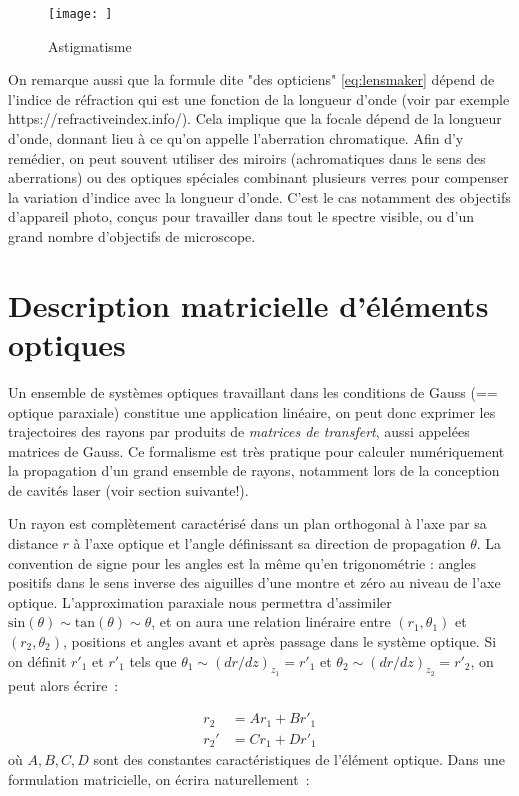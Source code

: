 \documentclass[a4paper]{book}
\begin{document}
\begin{figure}[!htbp]
\label{fig:astig}
\begin{center}
\texttt{[image: ]}
\end{center}
\caption{Astigmatisme}
\end{figure}
On remarque aussi que la formule dite "des opticiens" \ref{eq:lensmaker} dépend de l'indice de réfraction qui est une fonction de la longueur d'onde (voir par exemple https://refractiveindex.info/). Cela implique que la focale dépend de la longueur d'onde, donnant lieu à ce qu'on appelle l'aberration chromatique. Afin d'y remédier, on peut souvent utiliser des miroirs (achromatiques dans le sens des aberrations) ou des optiques spéciales combinant plusieurs verres pour compenser la variation d'indice avec la longueur d'onde. C'est le cas notamment des objectifs d'appareil photo, conçus pour travailler dans tout le spectre visible, ou d'un grand nombre d'objectifs de microscope. 

\section{Description matricielle d'éléments optiques}

Un ensemble de systèmes optiques travaillant dans les conditions de Gauss (== optique paraxiale) constitue une application linéaire, on peut donc exprimer les trajectoires des rayons par produits de \textit{matrices de transfert}, aussi appelées matrices de Gauss. Ce formalisme est  très pratique pour calculer numériquement la propagation d'un grand ensemble de rayons, notamment lors de la conception de cavités laser (voir section suivante!).

Un rayon est complètement caractérisé dans un plan orthogonal à l'axe par sa distance $r$ à l'axe optique et l'angle définissant sa direction de propagation $\theta$. La convention de signe pour les angles est la même qu'en trigonométrie : angles positifs dans le sens inverse des aiguilles d'une montre et zéro au niveau de l'axe optique. 
L'approximation paraxiale nous permettra d'assimiler $\mathrm{sin}(\theta)\sim\mathrm{tan}(\theta)\sim\theta$, et on aura une relation linéraire entre $\left(r_1, \theta_1\right)$ et $\left(r_2, \theta_2\right)$, positions et angles avant et après passage dans le système optique. Si on définit $r'_1$ et $r'_1$ tels que $\theta_1 \sim (dr/dz)_z_1 = r'_1$ et $\theta_2 \sim (dr/dz)_z_2 = r'_2$, on peut alors écrire~: 

\begin{align} 
r_2 &=  Ar_1 + Br'_1 \\ 
r_2' &=  Cr_1 + Dr'_1
\end{align}
où $A, B, C, D$ sont des constantes caractéristiques de l'élément optique. Dans une formulation matricielle, on écrira naturellement~:
\end{document}
